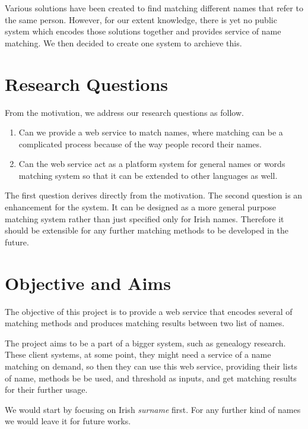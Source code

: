 Various solutions have been created to find
matching different names that refer to the same person. However,
for our extent knowledge, there is yet no public system which encodes
those solutions together and provides service of name matching.
We then decided to create one system to archieve this.

\pagebreak

\section{Research Questions}
\label{sec:rq}

From the motivation, we address our research questions as follow.

\begin{enumerate}
  \item Can we provide a web service to match names, where matching can be
    a complicated process because of the way people record their names.
  \item Can the web service act as a platform system for general names or words
    matching system so that it can be extended to other languages as well.
\end{enumerate}

The first question derives directly from the motivation.
The second question is an enhancement for the system. It can be designed
as a more general purpose matching system rather than just specified
only for Irish names. Therefore it should be extensible for any further
matching methods to be developed in the future.

\section{Objective and Aims}

The objective of this project is to provide a web service that
encodes several of matching methods and produces matching
results between two list of names.

The project aims to be a part of a bigger system, such as
genealogy research. These client systems, at some point,
they might need a service of a name matching on demand, so then they can use this
web service, providing their lists of name, methods be be used,
and threshold as inputs, and get matching results for their further usage.

We would start by focusing on Irish \textit{surname} first.
For any further kind of names we would leave it for future works.


